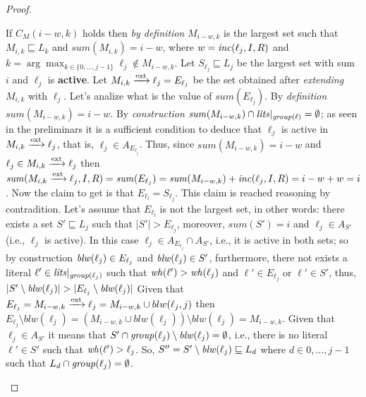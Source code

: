\begin{proof}
\begin{itemize}
\begin{itemize}
            If $C_M(i-w,k)$ holds then \textit{by definition} $M_{i-w,k}$ is the largest set 
            such that $M_{i,k} \sqsubseteq L_{k}$ and $\mathit{sum}(M_{i,k}) = i-w$, where 
            $w = \mathit{inc}(\ell_j,I,R)$ and $k = \arg \max_{k \in \{0,\hdots,j-1\}} \ell_j \not\in M_{i-w,k}$.
            Let $S_{\ell_j} \sqsubseteq L_j$ be the largest set with sum $i$
            and $\ell_j$ is \textbf{active}.
            Let $M_{i,k} \xrightarrow{\text{ext}} \ell_j = E_{\ell_j}$ be the set obtained after \textit{extending} 
            $M_{i,k}$ with $\ell_j$.
            Let's analize what is the value of $\mathit{sum}(E_{\ell_j})$.
            By \textit{definition} $\mathit{sum}(M_{i-w,k}) = i-w$.
            By \textit{construction}  $\mathit{sum}(M_{i-w,k}) \cap \mathit{lits}|_{\mathit{group}(\ell)} = \emptyset$;
            as seen in the preliminars it is a sufficient condition to deduce that $\ell_j$ is active 
            in $M_{i,k} \xrightarrow{\text{ext}} \ell_j$, that is, $\ell_j \in A_{E_{\ell_j}}$.
            Thus, since $\mathit{sum}(M_{i-w,k}) = i-w$ and $\ell_j \in M_{i,k} \xrightarrow{\text{ext}} \ell_j$ then 
            $\mathit{sum}(M_{i,k} \xrightarrow{\text{ext}} \ell_j,I,R) = \mathit{sum}(E_{\ell_j}) = \mathit{sum}(M_{i-w,k}) + \mathit{inc}(\ell_j,I,R) = i - w + w = i$.
            Now the claim to get is that $E_{\ell_l} = S_{\ell_j}$.
            This claim is reached reasoning by contradition.
            Let's assume that $E_{\ell_l}$ is not the largest set, in other words: 
            there exists a set $S' \sqsubseteq L_j$ such that $|S'| > E_{\ell_j}$, moreover,
            $\mathit{sum}(S') = i$ and $\ell_j \in A_{S'}$ (i.e., $\ell_j$ is active).
            In this case $\ell_j \in A_{E_{\ell_j}} \cap A_{S'}$, i.e., it is active in both sets;
            so by construction $\mathit{blw}(\ell_j) \in E_{\ell_j}$ and $\mathit{blw}(\ell_j) \in S'$, furthermore,
            there not exists a literal $\ell' \in \mathit{lits}|_{\mathit{group}(\ell_j)}$ such that $\mathit{wh}(\ell') > \mathit{wh}(\ell_j)$
            and $\ell' \in E_{\ell_j}$ or $\ell' \in S'$, thus, $|S' \setminus \mathit{blw}(\ell_j)| > |E_{\ell_j} \setminus \mathit{blw}(\ell_j)|$
            Given that $E_{\ell_j} = M_{i-w,k} \xrightarrow{\text{ext}} \ell_j = M_{i-w,k} \cup blw(\ell_j,j)$ then
            $E_{\ell_j} \setminus blw(\ell_j) = (M_{i-w,k} \cup blw(\ell_j)) \setminus blw(\ell_j) = M_{i-w,k}.$
            Given that $\ell_j \in A_{S'}$ it means that $S' \cap \mathit{group}(\ell_j) \setminus \mathit{blw}(\ell_j) = \emptyset$, i.e.,
            there is no literal $\ell' \in S'$ such that $\mathit{wh}(\ell') > \ell_j$.
            So, $S'' = S' \setminus \mathit{blw}(\ell_j) \sqsubseteq L_d$ where $d \in {0,\hdots,j-1}$
            such that $L_d \cap \mathit{group}(\ell_j) = \emptyset$.

\end{itemize}
\end{itemize}
\end{proof}
